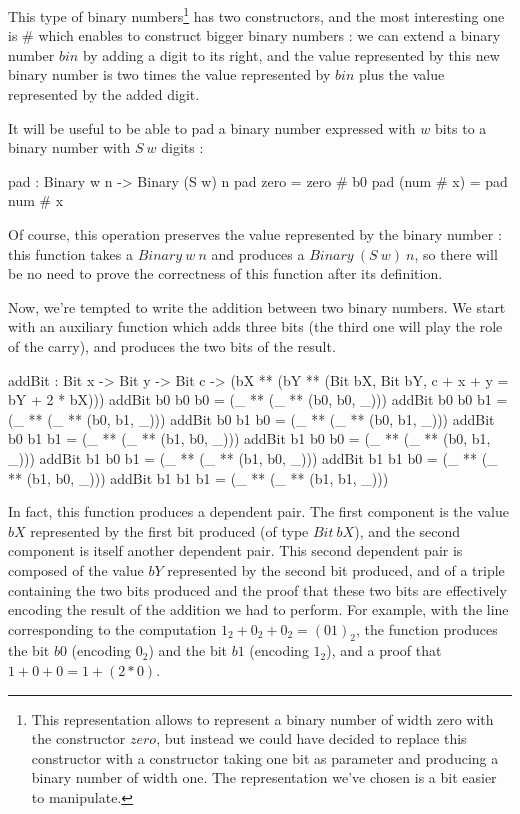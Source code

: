 This type of binary numbers\footnote{This representation allows to represent a binary number of width zero with the constructor $zero$, but instead we could have decided to replace this constructor with a constructor taking one bit as parameter and producing a binary number of width one. The representation we've chosen is a bit easier to manipulate.}  has two constructors, and the most interesting one is $\#$ which enables to construct bigger binary numbers : we can extend a binary number $bin$ by adding a digit to its right, and the value represented by this new binary number is two times the value represented by $bin$ plus the value represented by the added digit.

It will be useful to be able to pad a binary number expressed with $w$ bits to a binary number with $S\ w$ digits : 
\begin{code}[caption=Padding, captionpos=b, label=lst1:haskell2]
pad : Binary w n -> Binary (S w) n
pad zero = zero # b0
pad (num # x) = pad num # x
\end{code}
Of course, this operation preserves the value represented by the binary number : this function takes a $Binary\ w\ n$ and produces a $Binary\ (S\ w)\ n$, so there will be no need to prove the correctness of this function after its definition.

Now, we're tempted to write the addition between two binary numbers.
We start with an auxiliary function which adds three bits (the third one will play the role of the carry), and produces the two bits of the result.

\begin{code}[caption=Addition of three bits, captionpos=b, label=lst1:haskell2]
addBit : Bit x -> Bit y -> Bit c ->
          (bX ** (bY ** 
              (Bit bX, Bit bY, 
                  c + x + y = bY + 2 * bX)))
addBit b0 b0 b0 = (_ ** (_ ** (b0, b0, _)))
addBit b0 b0 b1 = (_ ** (_ ** (b0, b1, _)))
addBit b0 b1 b0 = (_ ** (_ ** (b0, b1, _)))
addBit b0 b1 b1 = (_ ** (_ ** (b1, b0, _)))
addBit b1 b0 b0 = (_ ** (_ ** (b0, b1, _)))
addBit b1 b0 b1 = (_ ** (_ ** (b1, b0, _)))
addBit b1 b1 b0 = (_ ** (_ ** (b1, b0, _)))
addBit b1 b1 b1 = (_ ** (_ ** (b1, b1, _)))
\end{code}

In fact, this function produces a dependent pair. The first component is the value $bX$ represented by the first bit produced (of type $Bit\ bX$), and the second component is itself another dependent pair. This second dependent pair is composed of the value $bY$ represented by the second bit produced, and of a triple containing the two bits produced and the proof that these two bits are effectively encoding the result of the addition we had to perform.
For example, with the line corresponding to the computation $1_2 + 0_2 + 0_2 = (01)_2$, the function produces the bit $b0$ (encoding $0_2$) and the bit $b1$ (encoding $1_2$), and a proof that $1 + 0 + 0 = 1 + (2*0)$.

